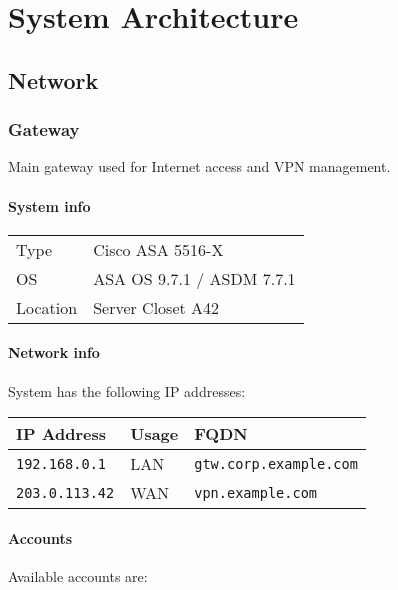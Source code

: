 \documentclass{demo}
\begin{document}

\customintro

\tableofcontents

\chapter{System Architecture}

\section{Network}

\subsection{Gateway}

Main gateway used for Internet access and VPN management.

\subsubsection{System info}
\begin{tabularx}{\textwidth}{l|l}
 Type & Cisco ASA 5516-X \\
 OS & ASA OS 9.7.1 / ASDM 7.7.1 \\
 Location & Server Closet A42 \\
\end{tabularx}

\subsubsection{Network info}

System has the following IP addresses:

\begin{tabularx}{\textwidth}{l|ll}
 IP Address & Usage & FQDN \\
 \hline\endhead
 \texttt{192.168.0.1} & LAN & \texttt{gtw.corp.example.com} \\
 \texttt{203.0.113.42} & WAN & \texttt{vpn.example.com} \\
\end{tabularx}

\subsubsection{Accounts}

Available accounts are:
\end{document}
